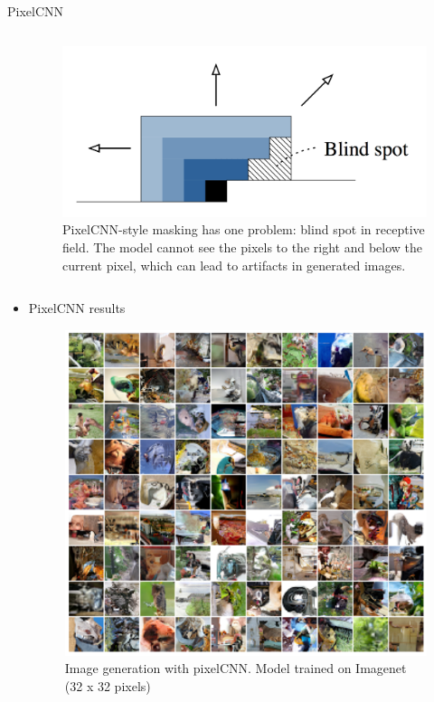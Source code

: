 \begin{frame}[allowframebreaks]{PixelCNN}
\begin{columns}
\begin{column}{0.5\textwidth}
        \end{column}
        \begin{column}{0.5\textwidth}
            \begin{figure}
                \centering
                \includegraphics[width=1.1\textwidth,keepaspectratio]{images/arm/pixelcnn-blindspot.png}
                \caption{PixelCNN-style masking has one problem: blind spot in receptive field. The model cannot see the pixels to the right and below the current pixel, which can lead to artifacts in generated images.}
            \end{figure}
        \end{column}
    \end{columns}

\framebreak

\begin{itemize}
    \item PixelCNN results
        \begin{figure}
        \centering
        \includegraphics[height=0.65\textheight, width=\textwidth, keepaspectratio]{images/arm/pixelcnn_results.png}
        \caption{Image generation with pixelCNN. Model trained on Imagenet (32 x 32 pixels)}
    \end{figure}
\end{itemize}
\end{frame}